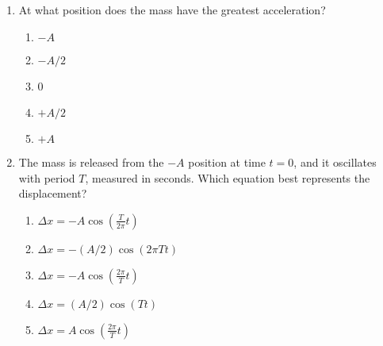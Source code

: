 \documentclass{../../../oss-classkick}
\begin{document}
\begin{multicols}{2}
\begin{enumerate}[leftmargin=18pt,resume]
  \item At what position does the mass have the greatest acceleration?
    \begin{enumerate}[nosep,leftmargin=18pt,label=(\Alph*)]
    \item $-A$
    \item $-A/2$
    \item 0
    \item $+A/2$
    \item $+A$
    \end{enumerate}
    
  \item The mass is released from the $-A$ position at time $t=0$, and it
    oscillates with period $T$, measured in seconds. Which equation best
    represents the displacement?
    \label{four}
    \begin{enumerate}[nosep,leftmargin=18pt,label=(\Alph*)]
    \item $\displaystyle \Delta x = -A\cos\left(\frac{T}{2\pi}t\right)$
    \item $\displaystyle \Delta x = -(A/2)\cos(2\pi T t)$
    \item $\displaystyle \Delta x = -A\cos\left(\frac{2\pi}{T}t\right)$
    \item $\displaystyle \Delta x = (A/2)\cos(T t)$
    \item $\displaystyle \Delta x = A\cos\left(\frac{2\pi}{T}t\right)$
    \end{enumerate}
  \end{enumerate}
\end{multicols}
\newpage


\genfreedirections
\end{document}
